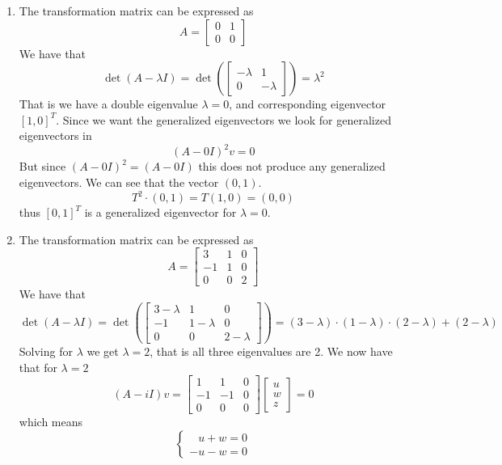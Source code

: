 \documentclass[a4paper,11pt,norsk]{article}
\begin{document}
\begin{enumerate}
    \item The transformation matrix can be expressed as
        \[
            A = \begin{bmatrix}
                    0 & 1 \\
                    0 & 0
                \end{bmatrix}
        \]
        We have that 
        \[
            \det(A - \lambda I) = \det\left(
                \begin{bmatrix}
                    -\lambda & 1        \\
                    0        & -\lambda
                \end{bmatrix}
            \right) = \lambda^2
        \]
        That is we have a double eigenvalue $\lambda = 0$, and corresponding eigenvector $[1, 0]^T$. Since we want the generalized eigenvectors
        we look for generalized eigenvectors in
        \[
            (A - 0I)^2v = 0
        \]
        But since $(A - 0I)^2 = (A - 0I)$ this does not produce any generalized eigenvectors. We can see that the vector $(0, 1)$.
        \[
            T^2 \cdot (0, 1) = T(1, 0) = (0, 0)
        \]
        thus $[0, 1]^T$ is a generalized eigenvector for $\lambda = 0$.

    \item The transformation matrix can be expressed as
        \[
            A = \begin{bmatrix}
                     3 & 1 & 0 \\
                    -1 & 1 & 0 \\
                     0 & 0 & 2
                \end{bmatrix}
        \]
        We have that 
        \[
            \det(A - \lambda I) = \det\left(
                \begin{bmatrix}
                    3-\lambda & 1 & 0 \\
                   -1 & 1-\lambda & 0 \\
                    0 & 0 & 2-\lambda
                \end{bmatrix}
            \right) = (3 - \lambda) \cdot (1 - \lambda) \cdot (2 - \lambda) + (2 - \lambda)
        \]
        Solving for $\lambda$ we get $\lambda = 2$, that is all three eigenvalues are 2.
        We now have that for $\lambda = 2$
        \[
            (A - iI)v = \begin{bmatrix} 1 & 1 & 0 \\ -1 & -1 & 0 \\ 0 & 0 & 0 \end{bmatrix} \begin{bmatrix} u \\ w \\ z \end{bmatrix} = 0
        \]
        which means
        \[
            \begin{cases}
               \:\:\,\,u + w  = 0 \\
                      -u - w  = 0
            \end{cases}
        \]


\end{enumerate}
\end{document}
